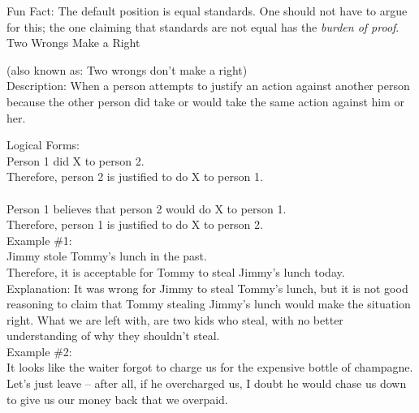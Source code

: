 \documentclass[a4paper,12pt,single,pdftex]{scrartcl}
\begin{document}
    
      Fun Fact: The default position is equal standards. One should not have to argue for this; the one claiming that standards are not equal has the {\em burden of proof}.
    \\

  

Two Wrongs Make a Right
    
      (also known as: Two wrongs don't make a right)
    \\

  
    Description: When a person attempts to justify an action against another person because the other person did take or would take the same action against him or her.

    
      Logical Forms:
    \\

    
      Person 1 did X to person 2.
    \\

    
      Therefore, person 2 is justified to do X to person 1.
    \\

    
       
    \\

    
      Person 1 believes that person 2 would do X to person 1.
    \\

    
      Therefore, person 1 is justified to do X to person 2.
    \\

    
      Example \#1:
    \\

    
      Jimmy stole Tommy’s lunch in the past.
    \\

    
      Therefore, it is acceptable for Tommy to steal Jimmy’s lunch today.
    \\

    
      Explanation: It was wrong for Jimmy to steal Tommy’s lunch, but it is not good reasoning to claim that Tommy stealing Jimmy’s lunch would make the situation right.  What we are left with, are two kids who steal, with no better understanding of why they shouldn’t steal.
    \\

    
      Example \#2:
    \\

    
      It looks like the waiter forgot to charge us for the expensive bottle of champagne.  Let’s just leave -- after all, if he overcharged us, I doubt he would chase us down to give us our money back that we overpaid.
    \\
\end{document}
